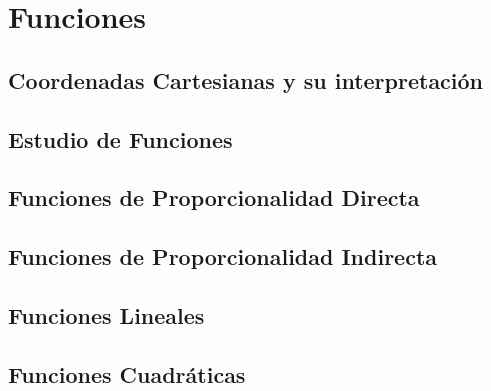\section{Funciones}

\subsection{Coordenadas Cartesianas y su interpretación}



\subsection{Estudio de Funciones}



\subsection{Funciones de Proporcionalidad Directa}



\subsection{Funciones de Proporcionalidad Indirecta}


\subsection{Funciones Lineales}


\subsection{Funciones Cuadráticas}


